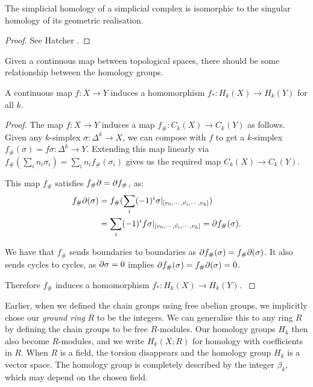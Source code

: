 \begin{theorem}
The simplicial homology of a simplicial complex is isomorphic to the singular homology of its geometric realisation.
\end{theorem}
\begin{proof}
See Hatcher \cite{hatcher}.
\end{proof}

Given a continuous map between topological spaces, there should be some relationship between the homology groups.

\begin{theorem}
A continuous map $f : X \to Y$ induces a homomorphism $f_* : H_k(X) \to H_k(Y)$ for all $k$.
\end{theorem}
\begin{proof}
The map $f : X \to Y$ induces a map $f_\# : C_k(X) \to C_k(Y)$ as follows. Given any $k$-simplex $\sigma : \Delta^k \to X$, we can compose with $f$ to get a $k$-simplex $f_\#(\sigma) = f \sigma : \Delta^k \to Y$. Extending this map linearly via $f_\#(\sum_i n_i \sigma_i) = \sum_i n_i f_\#(\sigma_i)$ gives us the required map $C_k(X) \to C_k(Y)$.

This map $f_\#$ satisfies $f_\# \partial = \partial f_\#$, as:
\begin{align*}
  f_\#\partial(\sigma) &= f_\#(\sum_i (-1)^i \sigma |_{[v_0, \cdots, \hat{v_i}, \cdots, v_k]}) \\
  &= \sum_i (-1)^i f \sigma |_{[v_0, \cdots, \hat{v_i}, \cdots, v_k]} = \partial f_\#(\sigma).
\end{align*}

We have that $f_\#$ sends boundaries to boundaries as $\partial f_\#(\sigma) = f_\# \partial(\sigma)$. It also sends cycles to cycles, as $\partial \sigma = 0$ implies $\partial f_\#(\sigma) = f_\# \partial(\sigma) = 0$.

Therefore $f_\#$ induces a homomorphism $f_* : H_k(X) \to H_k(Y)$.
\label{homology-functor}
\end{proof}

Earlier, when we defined the chain groups using free abelian groups, we implicitly chose our \emph{ground ring} $R$ to be the integers. We can generalise this to any ring $R$ by defining the chain groups to be free $R$-modules. Our homology groups $H_k$ then also become $R$-modules, and we write $H_k(X ; R)$ for homology with coefficients in $R$. When $R$ is a field, the torsion disappears and the homology group $H_k$ is a vector space. The homology group is completely described by the integer $\beta_k$, which may depend on the chosen field.

